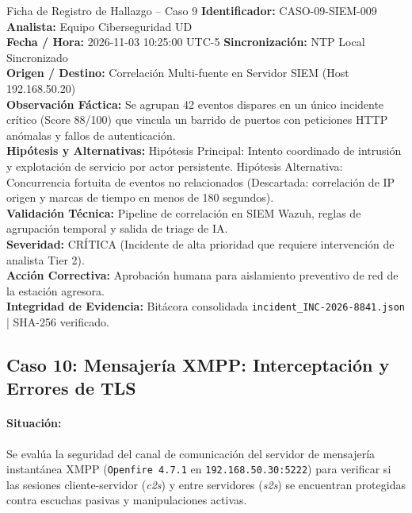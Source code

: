 \documentclass[11pt,letterpaper]{article}
\begin{document}
\begin{hallazgobox}{Ficha de Registro de Hallazgo -- Caso 9}
    \textbf{Identificador:} CASO-09-SIEM-009 \hfill \textbf{Analista:} Equipo Ciberseguridad UD\\
    \textbf{Fecha / Hora:} 2026-11-03 10:25:00 UTC-5 \hfill \textbf{Sincronización:} NTP Local Sincronizado\\
    \textbf{Origen / Destino:} Correlación Multi-fuente en Servidor SIEM (Host 192.168.50.20)\\
    \textbf{Observación Fáctica:} Se agrupan 42 eventos dispares en un único incidente crítico (Score 88/100) que vincula un barrido de puertos con peticiones HTTP anómalas y fallos de autenticación.\\
    \textbf{Hipótesis y Alternativas:} Hipótesis Principal: Intento coordinado de intrusión y explotación de servicio por actor persistente. Hipótesis Alternativa: Concurrencia fortuita de eventos no relacionados (Descartada: correlación de IP origen y marcas de tiempo en menos de 180 segundos).\\
    \textbf{Validación Técnica:} Pipeline de correlación en SIEM Wazuh, reglas de agrupación temporal y salida de triage de IA.\\
    \textbf{Severidad:} CRÍTICA (Incidente de alta prioridad que requiere intervención de analista Tier 2).\\
    \textbf{Acción Correctiva:} Aprobación humana para aislamiento preventivo de red de la estación agresora.\\
    \textbf{Integridad de Evidencia:} Bitácora consolidada \texttt{incident\_INC-2026-8841.json} | SHA-256 verificado.
\end{hallazgobox}

\newpage
\subsection{Caso 10: Mensajería XMPP: Interceptación y Errores de TLS}

\paragraph{Situación:} Se evalúa la seguridad del canal de comunicación del servidor de mensajería instantánea XMPP (\texttt{Openfire 4.7.1} en \texttt{192.168.50.30:5222}) para verificar si las sesiones cliente-servidor (\textit{c2s}) y entre servidores (\textit{s2s}) se encuentran protegidas contra escuchas pasivas y manipulaciones activas.
\end{document}
